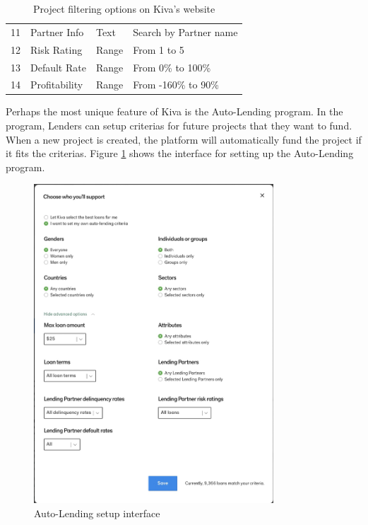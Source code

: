 \begin{table}[H]
{\begin{tabular}{|l|l|l|l|}
			11 & Partner Info                  & Text            & Search by Partner name                                                                                                  \\
			12 & Risk Rating                   & Range           & From 1 to 5                                                                                                             \\
			13 & Default Rate                  & Range           & From 0\% to 100\%                                                                                                       \\
			14 & Profitability                 & Range           & From -160\% to 90\%                                                                                                     \\
			\hline
		\end{tabular}%
	}
	\caption{Project filtering options on Kiva's website \parencite{kiva-browse}}
	\label{tab:browser-criteria}
\end{table}

Perhaps the most unique feature of Kiva is the Auto-Lending program.
In the program, Lenders can setup criterias for future projects that they want to fund.
When a new project is created, the platform will automatically fund the project if it fits the criterias.
Figure \ref{fig:auto-lend-setup} shows the interface for setting up the Auto-Lending program.

\begin{figure}[H]
	\centering
	\includegraphics[width=0.8\textwidth]{images/auto-lend-setup.png}
	\caption{Auto-Lending setup interface \parencite{kiva-autolend2}}
	\label{fig:auto-lend-setup}
\end{figure}


